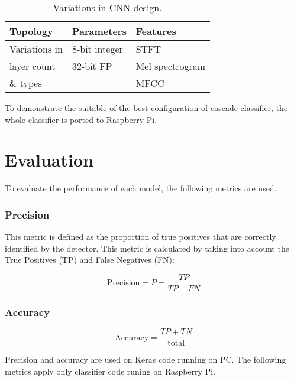 \begin{table}[h]
    \caption{Variations in CNN design.}
    \label{variations}
    \centering\small
    \begin{tabular}{lll}
        \toprule
        \textbf{Topology} & \textbf{Parameters} & \textbf{Features} \\
        \midrule
        Variations in   & 8-bit integer & STFT \\
        layer count     & 32-bit FP     & Mel spectrogram \\
        \& types        &               & MFCC \\
        \bottomrule
    \end{tabular}
\end{table}


To demonstrate the suitable of the best configuration of cascade classifier, the whole classifier is ported to Raspberry Pi. 

\section{Evaluation}

To evaluate the performance of each model, the following metrics are used.

\subsubsection{Precision}

This metric is defined as the proportion of true positives that are correctly identified by the detector. 
This metric is calculated by taking into account the True Positives (TP) and False Negatives (FN):

\[
\mathrm{Precision} = P = \frac{TP}{TP + FN}
\]

\subsubsection{Accuracy}

\[
\mathrm{Accuracy} = \frac{TP+TN}{\mathrm{total}}
\]

\noindent
Precision and accuracy are used on Keras code running on PC. The following metrics apply only classifier code runing on Raspberry Pi.

